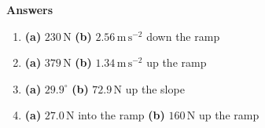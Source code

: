 \documentclass[11pt,a4paper]{article}
\begin{document}
\newpage
\begin{center}
    {\Large\bfseries Answers}
\end{center}
\begin{enumerate}
    \item \textbf{(a)} \(230\,\mathrm{N}\) \quad \textbf{(b)} \(2.56\,\mathrm{m\,s^{-2}}\) down the ramp
    \item \textbf{(a)} \(379\,\mathrm{N}\) \quad \textbf{(b)} \(1.34\,\mathrm{m\,s^{-2}}\) up the ramp
    \item \textbf{(a)} \(29.9^\circ\) \quad \textbf{(b)} \(72.9\,\mathrm{N}\) up the slope
    \item \textbf{(a)} \(27.0\,\mathrm{N}\) into the ramp \quad \textbf{(b)} \(160\,\mathrm{N}\) up the ramp
\end{enumerate}
\end{document}
